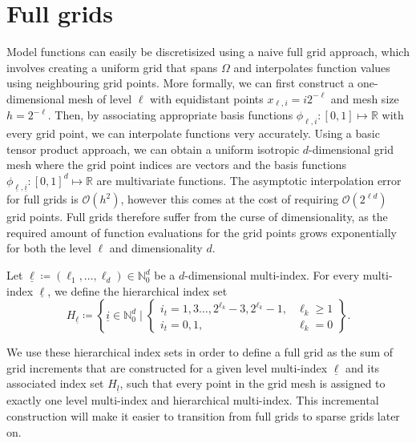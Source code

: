 \documentclass[
  a4paper,  %
  twoside,  %
  bibliography=totoc,
  headsepline,
  cleardoublepage=empty,
  parskip=half,
  draft=false
]{scrbook}
\begin{document}
\section{Full grids}

Model functions can easily be discretisized using a naive full grid approach, which involves creating a uniform grid that spans $\Omega$ and interpolates function values using neighbouring grid points.
More formally, we can first construct a one-dimensional mesh of level $\ell$ with equidistant points $x_{\ell,i}=i2^{-\ell}$ and mesh size $h=2^{-\ell}$.
Then, by associating appropriate basis functions $\phi_{\ell,i} \colon [0,1] \mapsto \mathds{R}$ with every grid point, we can interpolate functions very accurately.
Using a basic tensor product approach, we can obtain a uniform isotropic $d$-dimensional grid mesh where the grid point indices are vectors and the basis functions $\phi_{\underline{\ell},\underline{i}} \colon [0,1]^d \mapsto \mathds{R}$ are multivariate functions.
The asymptotic interpolation error for full grids is $\mathcal{O}(h^2)$, however this comes at the cost of requiring $\mathcal{O}(2^{\ell d})$ grid points.
Full grids therefore suffer from the curse of dimensionality, as the required amount of function evaluations for the grid points grows exponentially for both the level $\ell$ and dimensionality $d$.

\begin{definition}
Let $\underline{\ell} \coloneqq (\ell_1, \dots, \ell_d) \in \mathds{N}_0^d$ be a $d$-dimensional multi-index.
For every multi-index $\underline{\ell}$, we define the hierarchical index set
\begin{equation}
H_{\underline{\ell}} \coloneqq \left\{ \underline{i} \in \mathds{N}^d_0 \mid
\begin{cases}
    i_t=1,3\dots,2^{\ell_k} - 3, 2^{\ell_k} - 1, & \ell_k \geq 1 \\
    i_t=0,1, & \ell_k = 0
\end{cases} \right\}.
\end{equation}
\end{definition}
%
We use these hierarchical index sets in order to define a full grid as the sum of grid increments that are constructed for a given level multi-index $\underline{\ell}$ and its associated index set $H_{\underline{l}}$, such that every point in the grid mesh is assigned to exactly one level multi-index and hierarchical multi-index.
This incremental construction will make it easier to transition from full grids to sparse grids later on.
\end{document}
